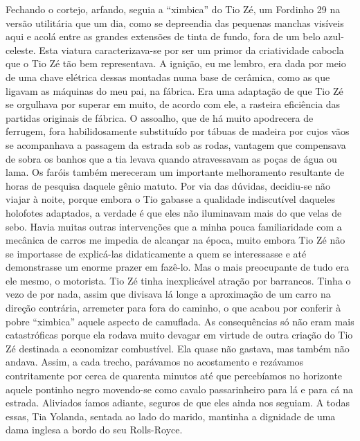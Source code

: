 Fechando o cortejo, arfando, seguia a ``ximbica'' do Tio Zé, um Fordinho 29 na versão utilitária que um dia, como se depreendia das pequenas manchas visíveis aqui e acolá entre as grandes extensões de tinta de fundo, fora de um belo azul-celeste.
Esta viatura caracterizava-se por ser um primor da criatividade cabocla que o Tio Zé tão bem representava.
A ignição, eu me lembro, era dada por meio de uma chave elétrica dessas montadas numa base de cerâmica, como as que ligavam as máquinas do meu pai, na fábrica.
Era uma adaptação de que Tio Zé se orgulhava por superar em muito, de acordo com ele, a rasteira eficiência das partidas originais de fábrica.
O assoalho, que de há muito apodrecera de ferrugem, fora habilidosamente substituído por tábuas de madeira por cujos vãos se acompanhava a passagem da estrada sob as rodas, vantagem que compensava de sobra os banhos que a tia levava quando atravessavam as poças de água ou lama.
Os faróis também mereceram um importante melhoramento resultante de horas de pesquisa daquele gênio matuto.
Por via das dúvidas, decidiu-se não viajar à noite, porque embora o Tio gabasse a qualidade indiscutível daqueles holofotes adaptados, a verdade é que eles não iluminavam mais do que velas de sebo.
Havia muitas outras intervenções que a minha pouca familiaridade com a mecânica de carros me impedia de alcançar na época, muito embora Tio Zé não se importasse de explicá-las didaticamente a quem se interessasse e até demonstrasse um enorme prazer em fazê-lo.
Mas o mais preocupante de tudo era ele mesmo, o motorista.
Tio Zé tinha inexplicável atração por barrancos.
Tinha o vezo de por nada, assim que divisava lá longe a aproximação de um carro na direção contrária, arremeter para fora do caminho, o que acabou por conferir à pobre “ximbica” aquele aspecto de camuflada.
As consequências só não eram mais catastróficas porque ela rodava muito devagar em virtude de outra criação do Tio Zé destinada a economizar combustível.
Ela quase não gastava, mas também não andava.
Assim, a cada trecho, parávamos no acostamento e rezávamos contritamente por cerca de quarenta minutos até que percebíamos no horizonte aquele pontinho negro movendo-se como cavalo passarinheiro para lá e para cá na estrada.
Aliviados íamos adiante, seguros de que eles ainda nos seguiam.
A todas essas, Tia Yolanda, sentada ao lado do marido, mantinha a dignidade de uma dama inglesa a bordo do seu Rolls-Royce.

